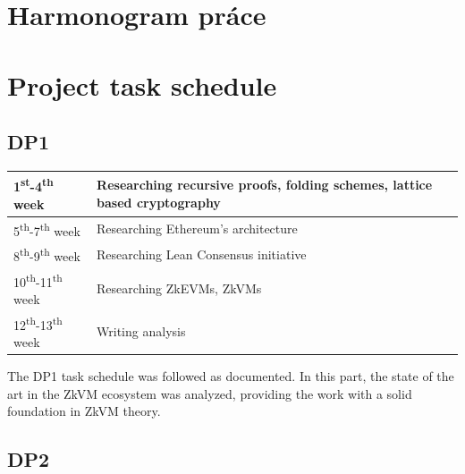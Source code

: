 \thispagestyle{empty}

\ifx\FIITlagEN\undefined
	\chapter{Harmonogram práce}
\else
	\chapter{Project task schedule}
\fi

\renewcommand*{\thepage}{A-\arabic{page}}

\section{DP1}

\begin{tabular}{|l||p{}|}
	\hline
	1\textsuperscript{st}-4\textsuperscript{th} week   & Researching recursive proofs, folding schemes, lattice based cryptography \\
	\hline
	5\textsuperscript{th}-7\textsuperscript{th} week   & Researching Ethereum's architecture                                       \\
	\hline
	8\textsuperscript{th}-9\textsuperscript{th} week   & Researching Lean Consensus initiative                                     \\
	\hline
	10\textsuperscript{th}-11\textsuperscript{th} week & Researching ZkEVMs, ZkVMs                                                 \\
	\hline
	12\textsuperscript{th}-13\textsuperscript{th} week & Writing analysis                                                          \\
	\hline
\end{tabular}

The DP1 task schedule was followed as documented. In this part, the state of
the art in the ZkVM ecosystem was analyzed, providing the work with a solid foundation in ZkVM theory.

\section{DP2}

